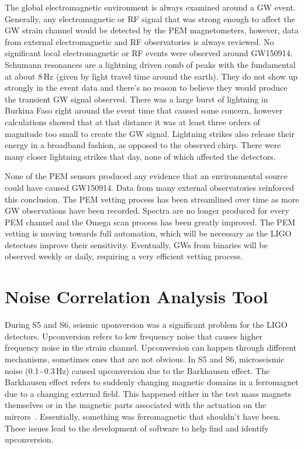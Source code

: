 The global electromagnetic environment is always examined around a GW event. Generally, any electromagnetic or RF signal that was strong enough to affect the GW strain channel would be detected by the PEM magnetometers, however, data from external electromagnetic and RF observatories is always reviewed. No significant local electromagnetic or RF events were observed around GW150914. Schumann resonances are a lightning driven comb of peaks with the fundamental at about 8\,Hz (given by light travel time around the earth). They do not show up strongly in the event data and there's no reason to believe they would produce the transient GW signal observed. There was a large burst of lightning in Burkina Faso right around the event time that caused some concern, however calculations showed that at that distance it was at least three orders of magnitude too small to create the GW signal. Lightning strikes also release their energy in a broadband fashion, as opposed to the observed chirp. There were many closer lightning strikes that day, none of which affected the detectors.

None of the PEM sensors produced any evidence that an environmental source could have caused GW150914. Data from many external observatories reinforced this conclusion. The PEM vetting process has been streamlined over time as more GW observations have been recorded. Spectra are no longer produced for every PEM channel and the Omega scan process has been greatly improved. The PEM vetting is moving towards full automation, which will be necessary as the LIGO detectors improve their sensitivity. Eventually, GWs from binaries will be observed weekly or daily, requiring a very efficient vetting process.

\section{Noise Correlation Analysis Tool}

During S5 and S6, seismic uponversion was a significant problem for the LIGO detectors. Upconversion refers to low frequency noise that causes higher frequency noise in the strain channel. Upconversion can happen through different mechanisms, sometimes ones that are not obvious. In S5 and S6, microseismic noise (0.1\,-\,0.3\,Hz) caused upconversion due to the Barkhausen effect. The Barkhausen effect refers to suddenly changing magnetic domains in a ferromagnet due to a changing external field. This happened either in the test mass magnets themselves or in the magnetic parts associated with the actuation on the mirrors~\cite{S6_characterization, weiss2008various}. Essentially, something was ferromagnetic that shouldn't have been. These issues lead to the development of software to help find and identify upconversion.

